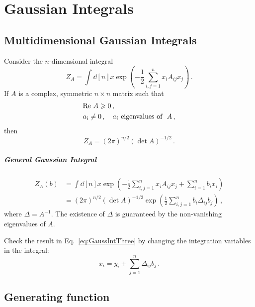 \documentclass[notes.tex]{subfiles}
\begin{document}
\chapter{Gaussian Integrals}
\label{chap:lec0}

\section{Multidimensional Gaussian Integrals}
\label{sec:mult-gauss-integr}

Consider the $n$-dimensional integral
\begin{equation}
  \label{eq:GaussIntOne}
  Z_A = \int \dd[n]{x} \exp\left(
    -\frac12 \sum_{i,j=1}^n x_i A_{ij} x_j
    \right)\, .
\end{equation}
If $A$ is a complex, symmetric $n\times n$ matrix such that
\begin{align}
  & \mathrm{Re}\ A \geqslant 0 \, ,\\
  & a_i \neq 0\, , \quad a_i\ \text{eigenvalues of }\ A\, ,
\end{align}
then 
\begin{equation}
  \label{eq:GaussIntTwo}
  Z_A = \left(2\pi\right)^{n/2} \left(\det A \right)^{-1/2}\, .
\end{equation}

\paragraph{General Gaussian Integral}

\begin{align}
  Z_A(b) &= \int \dd[n]{x} \exp\left(
  -\frac12 \sum_{i,j=1}^n x_i A_{ij} x_j
  + \sum_{i=1}^n b_i x_i
  \right) \\
  \label{eq:GaussIntThree}
  &=  \left(2\pi\right)^{n/2} \left(\det A \right)^{-1/2}
    \exp\left(
  \frac12 \sum_{i,j=1}^n b_i \Delta_{ij} b_j
  \right) \, ,
\end{align}
where $\Delta = A^{-1}$. The existence of $\Delta$ is guaranteed by the non-vanishing eigenvalues of $A$.
\begin{Ex}
  Check the result in Eq.~\ref{eq:GaussIntThree} by changing the integration variables in the integral:
  \[
    x_i = y_i + \sum_{j=1}^n \Delta_{ij} b_j\, .
  \]
\end{Ex}

\section{Generating function}
\label{sec:generating-function}
\end{document}
